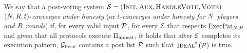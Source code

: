 \begin{definition}
  We say that a post-voting system $\mathcal{S} = \left(\textsc{Init}, \textsc{Aux},
  \textsc{HandleVote}, \textsc{Vote}\right)$ $\left(N, R,
  t\right)$-\emph{converges under honesty} (or \emph{$t$-converges under honesty
  for $N$ players and $R$ rounds}) if, for every valid input
  $\mathcal{P}$, for every $\mathcal{E}$ that respects $\mathrm{ExecPat}_{N, R}$
  and given that all protocols execute $\Pi_{\mathrm{honest}}$, it holds that after $\mathcal{E}$
  completes its execution pattern, $\mathcal{G}_{\mathrm{Feed}}$ contains a post list $\mathcal{P}$
  such that $\textsc{Ideal}^t\left(\mathcal{P}\right)$ is true.
\end{definition}
